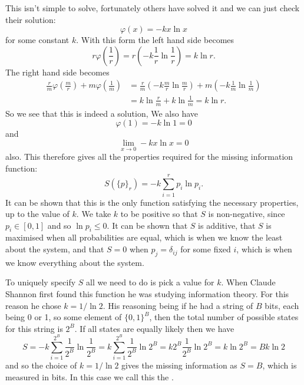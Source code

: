 \documentclass[fleqn]{NotesClass}
\begin{document}
    This isn't simple to solve, fortunately others have solved it and we can just check their solution:
    \begin{equation}
        \varphi(x) = -kx\ln x
    \end{equation}
    for some constant \(k\).
    With this form the left hand side becomes
    \begin{equation}
        r\varphi\left( \frac{1}{r} \right) = r\left( -k\frac{1}{r}\ln\frac{1}{r} \right) = k\ln r.
    \end{equation}
    The right hand side becomes
    \begin{align}
        \frac{r}{m} \varphi\left( \frac{m}{r} \right) + m \varphi\left( \frac{1}{m} \right)&= \frac{r}{m}\left( -k\frac{m}{r}\ln\frac{m}{r} \right) + m\left( -k\frac{1}{m}\ln\frac{1}{m} \right)\\
        &= k\ln\frac{r}{m} + k\ln\frac{1}{m} = k\ln r.
    \end{align}
    So we see that this is indeed a solution,
    We also have
    \begin{equation}
        \varphi(1) = -k\ln 1 = 0 
    \end{equation}
    and
    \begin{equation}
        \lim_{x\to 0} -kx\ln x = 0
    \end{equation}
    also.
    This therefore gives all the properties required for the missing information function:
    \begin{equation}
        S(\{p\}_r) = -k\sum_{i=1}^{r} p_i\ln p_i.
    \end{equation}
    It can be shown that this is the only function satisfying the necessary properties, up to the value of \(k\).
    We take \(k\) to be positive so that \(S\) is non-negative, since \(p_i \in [0, 1]\) and so \(\ln p_i \le 0\).
    It can be shown that \(S\) is additive, that \(S\) is maximised when all probabilities are equal, which is when we know the least about the system, and that \(S = 0\) when \(p_j = \delta_{ij}\) for some fixed \(i\), which is when we know everything about the system.
    
    To uniquely specify \(S\) all we need to do is pick a value for \(k\).
    When Claude Shannon first found this function he was studying information theory.
    For this reason he chose \(k = 1/\ln 2\).
    His reasoning being if he had a string of \(B\) bits, each being 0 or 1, so some element of \(\{0, 1\}^{B}\), then the total number of possible states for this string is \(2^{B}\).
    If all states are equally likely then we have
    \begin{equation}
        S = -k\sum_{i=1}^{2^B} \frac{1}{2^{B}} \ln \frac{1}{2^{B}} = k\sum_{i=1}^{2^B} \frac{1}{2^B}\ln 2^B = k2^B\frac{1}{2^B}\ln 2^B = k\ln 2^B = Bk\ln 2
    \end{equation}
    and so the choice of \(k = 1/\ln 2\) gives the missing information as \(S = B\), which is measured in bits.
    In this case we call this the .
    
\end{document}

